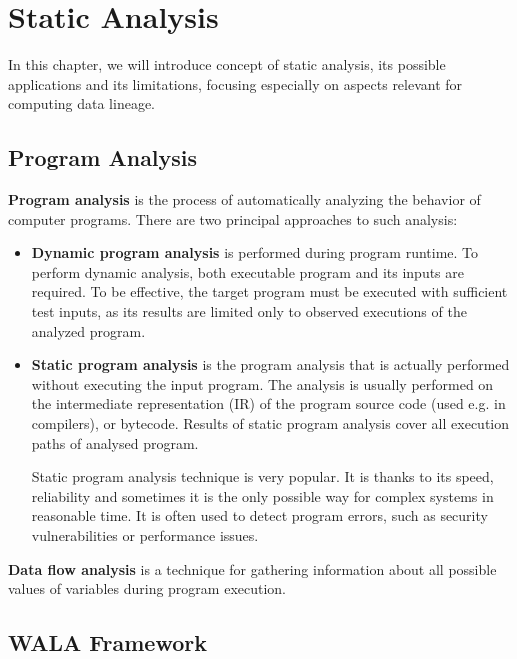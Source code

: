 
\chapter{Static Analysis \label{chapter:analysis}}

In this chapter, we will introduce concept of static analysis,
its possible applications and its limitations,
focusing especially on aspects relevant for computing data lineage.



\section{Program Analysis}

\textbf{Program analysis} is the process of automatically analyzing the behavior
of computer programs. There are two principal approaches to such analysis:
\begin{itemize}
  \item \textbf{Dynamic program analysis} is performed during program runtime.
    To perform dynamic analysis, both executable program
    and its inputs are required. To be effective, the target program
    must be executed with sufficient test inputs, as its results
    are limited only to observed executions of the analyzed program.
  \item \textbf{Static program analysis} is the program analysis that is actually
    performed without executing the input program. The analysis is usually
    performed on the intermediate representation (IR) of the program source code
    (used e.g. in compilers), or bytecode.
    Results of static program analysis cover all execution paths of
    analysed program.

    Static program analysis technique is very popular. It is thanks
    to its speed, reliability and sometimes it is the only possible
    way for complex systems in reasonable time.
    It is often used to detect program errors, such as
    security vulnerabilities or performance issues.
\end{itemize}

\textbf{Data flow analysis} is a technique for gathering information about
all possible values of variables during program execution.



\section{WALA Framework \label{chapter:analysis:wala}}


